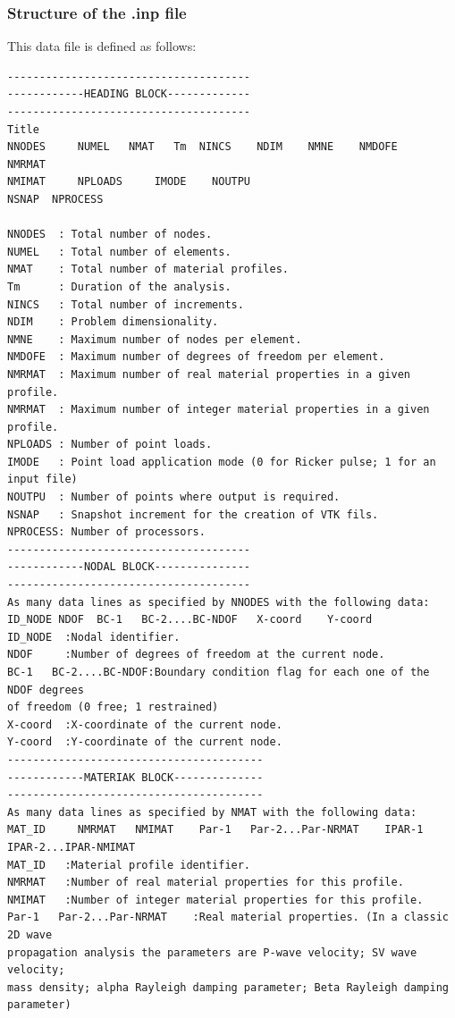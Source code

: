 \documentclass[12pt,letterpaper]{article}
\begin{document}
\subsubsection*{Structure of the {\bf *.inp} file}
This data file is defined as follows:

\begin{verbatim}
--------------------------------------
------------HEADING BLOCK-------------
--------------------------------------
Title
NNODES     NUMEL   NMAT   Tm  NINCS    NDIM    NMNE    NMDOFE     NMRMAT
NMIMAT     NPLOADS     IMODE    NOUTPU
NSNAP  NPROCESS

NNODES  : Total number of nodes.
NUMEL   : Total number of elements.
NMAT    : Total number of material profiles.
Tm      : Duration of the analysis.
NINCS   : Total number of increments.
NDIM    : Problem dimensionality.
NMNE    : Maximum number of nodes per element.
NMDOFE  : Maximum number of degrees of freedom per element.
NMRMAT  : Maximum number of real material properties in a given profile.
NMRMAT  : Maximum number of integer material properties in a given profile.
NPLOADS : Number of point loads.     
IMODE   : Point load application mode (0 for Ricker pulse; 1 for an input file)    
NOUTPU  : Number of points where output is required.
NSNAP   : Snapshot increment for the creation of VTK fils.
NPROCESS: Number of processors.
--------------------------------------
------------NODAL BLOCK---------------
--------------------------------------
As many data lines as specified by NNODES with the following data:
ID_NODE NDOF  BC-1   BC-2....BC-NDOF   X-coord    Y-coord
ID_NODE  :Nodal identifier. 
NDOF     :Number of degrees of freedom at the current node.  
BC-1   BC-2....BC-NDOF:Boundary condition flag for each one of the NDOF degrees
of freedom (0 free; 1 restrained)   
X-coord  :X-coordinate of the current node.    
Y-coord  :Y-coordinate of the current node.
----------------------------------------
------------MATERIAK BLOCK--------------
----------------------------------------
As many data lines as specified by NMAT with the following data:
MAT_ID     NMRMAT   NMIMAT    Par-1   Par-2...Par-NRMAT    IPAR-1
IPAR-2...IPAR-NMIMAT
MAT_ID   :Material profile identifier.
NMRMAT   :Number of real material properties for this profile.   
NMIMAT   :Number of integer material properties for this profile.    
Par-1   Par-2...Par-NRMAT    :Real material properties. (In a classic 2D wave
propagation analysis the parameters are P-wave velocity; SV wave velocity;
mass density; alpha Rayleigh damping parameter; Beta Rayleigh damping
parameter)

\end{verbatim}
\end{document}
